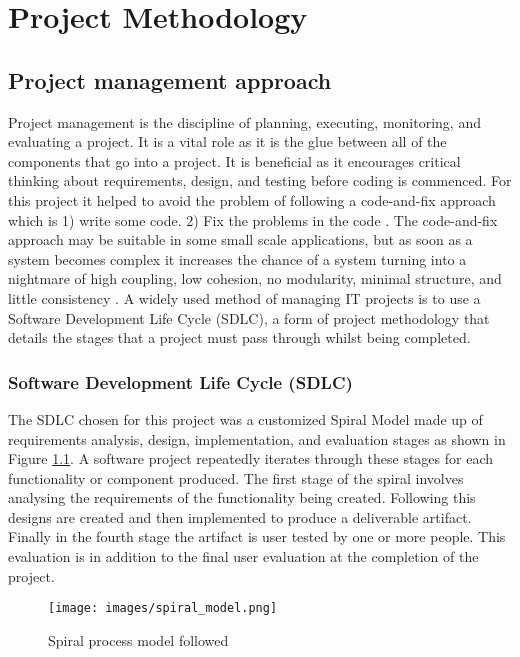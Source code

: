 
\chapter{Project Methodology}\label{C:m}

\section{Project management approach}
Project management is the discipline of planning, executing, monitoring, and
evaluating a project. It is a vital role as it is the glue between all of the
 components that go into a project. It is beneficial as it
encourages critical thinking about requirements, design, and testing before coding is
commenced. For this project it helped to avoid the problem of following a
code-and-fix approach which is 1) write some code. 2) Fix the problems in
the code \cite{boehm1988spiral}. The code-and-fix approach may be suitable in some 
small scale applications, but as soon as a system becomes complex it increases
the chance of a system turning into a nightmare of high coupling, low cohesion,
no modularity, minimal structure, and little consistency \cite{foote1997big}.
A widely used method of managing IT projects is to use a Software Development
Life Cycle (SDLC), a form of project methodology that details the stages that a project must pass through whilst being completed.

\subsection{Software Development Life Cycle (SDLC)}
The SDLC chosen for
this project was a customized Spiral Model \cite{boehm1988spiral} made up of
requirements analysis, design, implementation, and evaluation stages as shown in
Figure \ref{fig:spiralModel}. A software project repeatedly iterates through these stages for each functionality or component produced. The first stage of the spiral involves analysing the
requirements of the functionality being created. Following this designs are created and then implemented to produce a deliverable artifact. Finally in the fourth stage the artifact is user tested by one
or more people. This evaluation is in addition to the final user evaluation at the completion of the project. 

\begin{figure}[H]
  \centering
      \texttt{[image: images/spiral\_model.png]}
  \caption{Spiral process model followed}
  \label{fig:spiralModel}
\end{figure}

